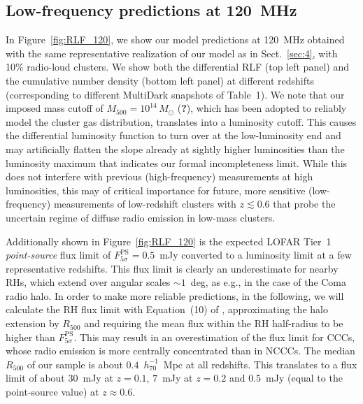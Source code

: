 \documentclass[traditabstract]{aa}
\newcommand{\rmn}{\mathrm}
\begin{document}
\subsection{Low-frequency predictions at 120~MHz}

In Figure~\ref{fig:RLF_120}, we show our model predictions at 120~MHz obtained
with the same representative realization of our model as in Sect.~\ref{sec:4},
with 10\% radio-loud clusters. We show both the differential RLF (top left
panel) and the cumulative number density (bottom left panel) at different
redshifts (corresponding to different MultiDark snapshots of Table~1). We note
that our imposed mass cutoff of $M_{500}=10^{14}\,M_\odot$ ({\bf ?}), which has
been adopted to reliably model the cluster gas distribution, translates into a
luminosity cutoff. This causes the differential luminosity function to turn over
at the low-luminosity end and may artificially flatten the slope already at
sightly higher luminosities than the luminosity maximum that indicates our formal
incompleteness limit. While this does not interfere with previous
(high-frequency) measurements at high luminosities, this may of critical
importance for future, more sensitive (low-frequency) measurements of
low-redshift clusters with $z\lesssim 0.6$ that probe the uncertain regime of
diffuse radio emission in low-mass clusters.

Additionally shown in Figure~\ref{fig:RLF_120} is the expected LOFAR Tier~1
\emph{point-source} flux limit of $F_{5\sigma}^{\rmn{PS}}=0.5$~mJy
\citep{2012JApA..tmp...34R} converted to a luminosity limit at a few representative
redshifts. This flux limit is clearly an underestimate for nearby RHs, which
extend over angular scales $\sim1$~deg, as e.g., in the case of the Coma radio
halo. In order to make more reliable predictions, in the following, we will
calculate the RH flux limit with Equation~(10) of \cite{2010A&A...509A..68C},
approximating the halo extension by $R_{500}$ and requiring the mean flux within
the RH half-radius to be higher than $F_{5\sigma}^{\rmn{PS}}$. This may result
in an overestimation of the flux limit for CCCs, whose radio emission is more
centrally concentrated than in NCCCs. The median $R_{500}$ of our sample is
about $0.4$~$h_{70}^{-1}$~Mpc at all redshifts. This translates to a flux limit
of about $30$~mJy at $z = 0.1$, $7$~mJy at $z = 0.2$ and $0.5$~mJy (equal to the
point-source value) at $z \approx 0.6$.
\end{document}
